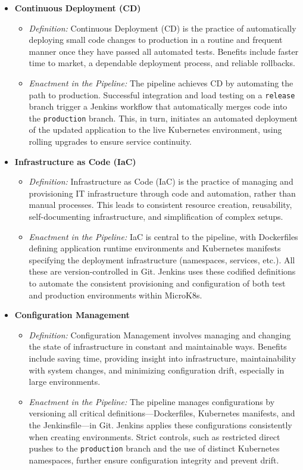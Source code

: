 \begin{itemize}
    \item \textbf{Continuous Deployment (CD)}
    \begin{itemize}
        \item \textit{Definition:} Continuous Deployment (CD) is the practice of automatically deploying small code changes to production in a routine and frequent manner once they have passed all automated tests. Benefits include faster time to market, a dependable deployment process, and reliable rollbacks.
        \item \textit{Enactment in the Pipeline:} The pipeline achieves CD by automating the path to production. Successful integration and load testing on a \texttt{release} branch trigger a Jenkins workflow that automatically merges code into the \texttt{production} branch. This, in turn, initiates an automated deployment of the updated application to the live Kubernetes environment, using rolling upgrades to ensure service continuity.
    \end{itemize}

    \item \textbf{Infrastructure as Code (IaC)}
    \begin{itemize}
        \item \textit{Definition:} Infrastructure as Code (IaC) is the practice of managing and provisioning IT infrastructure through code and automation, rather than manual processes. This leads to consistent resource creation, reusability, self-documenting infrastructure, and simplification of complex setups.
        \item \textit{Enactment in the Pipeline:} IaC is central to the pipeline, with Dockerfiles defining application runtime environments and Kubernetes manifests specifying the deployment infrastructure (namespaces, services, etc.). All these are version-controlled in Git. Jenkins uses these codified definitions to automate the consistent provisioning and configuration of both test and production environments within MicroK8s.
    \end{itemize}

    \item \textbf{Configuration Management}
    \begin{itemize}
        \item \textit{Definition:} Configuration Management involves managing and changing the state of infrastructure in constant and maintainable ways. Benefits include saving time, providing insight into infrastructure, maintainability with system changes, and minimizing configuration drift, especially in large environments.
        \item \textit{Enactment in the Pipeline:} The pipeline manages configurations by versioning all critical definitions—Dockerfiles, Kubernetes manifests, and the Jenkinsfile—in Git. Jenkins applies these configurations consistently when creating environments. Strict controls, such as restricted direct pushes to the \texttt{production} branch and the use of distinct Kubernetes namespaces, further ensure configuration integrity and prevent drift.
    \end{itemize}


\end{itemize}
